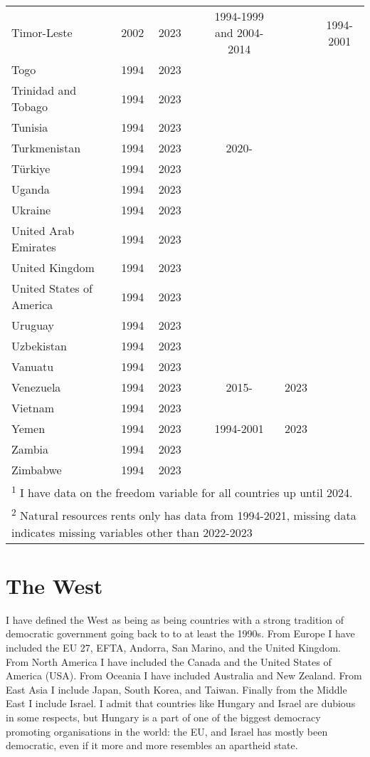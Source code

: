 {\begin{longtable}{lcccccc}
\addlinespace
Timor-Leste & 2002 & 2023 &  & 1994-1999 and 2004-2014 &  & 1994-2001\\
Togo & 1994 & 2023 &  &  &  & \\
Trinidad and Tobago & 1994 & 2023 &  &  &  & \\
Tunisia & 1994 & 2023 &  &  &  & \\
Turkmenistan & 1994 & 2023 &  & 2020- &  & \\
\addlinespace
Türkiye & 1994 & 2023 &  &  &  & \\
Uganda & 1994 & 2023 &  &  &  & \\
Ukraine & 1994 & 2023 &  &  &  & \\
United Arab Emirates & 1994 & 2023 &  &  &  & \\
United Kingdom & 1994 & 2023 &  &  &  & \\
\addlinespace
United States of America & 1994 & 2023 &  &  &  & \\
Uruguay & 1994 & 2023 &  &  &  & \\
Uzbekistan & 1994 & 2023 &  &  &  & \\
Vanuatu & 1994 & 2023 &  &  &  & \\
Venezuela & 1994 & 2023 &  & 2015- & 2023 & \\
\addlinespace
Vietnam & 1994 & 2023 &  &  &  & \\
Yemen & 1994 & 2023 &  & 1994-2001 & 2023 & \\
Zambia & 1994 & 2023 &  &  &  & \\
Zimbabwe & 1994 & 2023 &  &  &  & \\
\bottomrule
\multicolumn{7}{l}{\rule{0pt}{1em}\textsuperscript{1} I have data on the freedom variable for all countries up until 2024.} \\ 
\multicolumn{7}{l}{\rule{0pt}{1em}\textsuperscript{2} Natural resources rents only has data from 1994-2021, missing data indicates missing variables other than 2022-2023} \\
\end{longtable}
}

\section{The West}
I have defined the West as being as being countries with a strong tradition of democratic government going back to to at least the 1990s. From Europe I have included the EU 27, EFTA, Andorra, San Marino, and the United Kingdom. From North America I have included the Canada and the United States of America (USA). From Oceania I have included Australia and New Zealand. From East Asia I include Japan, South Korea, and Taiwan. Finally from the Middle East I include Israel. I admit that countries like Hungary and Israel are dubious in some respects, but Hungary is a part of one of the biggest democracy promoting organisations in the world: the EU, and Israel has mostly been democratic, even if it more and more resembles an apartheid state.

